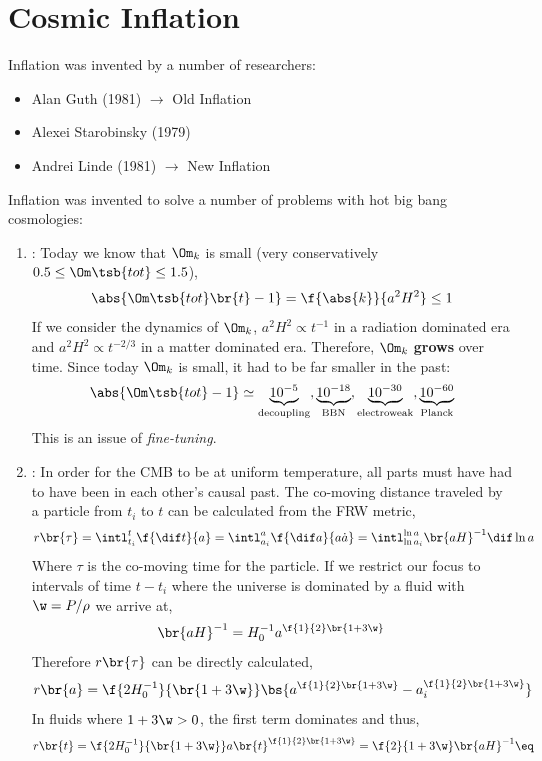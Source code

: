 \documentclass{article}
\begin{document}
\section{Cosmic Inflation}

Inflation was invented by a number of researchers:
\begin{itemize}
    \item Alan Guth (1981) $\to$ Old Inflation
    \item Alexei Starobinsky (1979)
    \item Andrei Linde (1981) $\to$ New Inflation
\end{itemize}

Inflation was invented to solve a number of problems with hot big bang cosmologies:
\begin{enumerate}
    \item {}: Today we know that $\Om_k$ is small (very conservatively $0.5 \leq \Om\tsb{tot} \leq 1.5$),
    \[ \abs{\Om\tsb{tot}\br{t} - 1} = \f{\abs{k}}{a^2 H^2} \leq 1 \]
    If we consider the dynamics of $\Om_k$, $a^2 H^2 \propto t^{-1}$ in a radiation dominated era and $a^2 H^2 \propto t^{-2/3}$ in a matter dominated era. Therefore, $\Om_k$ \textbf{grows} over time. Since today $\Om_k$ is small, it had to be far smaller in the past:
    \[ \abs{\Om\tsb{tot} - 1} \simeq \underbrace{10^{-5}}_{\text{decoupling}}, \underbrace{10^{-18}}_{\text{BBN}}, \underbrace{10^{-30}}_{\text{electroweak}}, \underbrace{10^{-60}}_{\text{Planck}} \]
    This is an issue of \textit{fine-tuning}.
    \item {}: In order for the CMB to be at uniform temperature, all parts must have had to have been in each other's causal past.
    The co-moving distance traveled by a particle from $t_i$ to $t$ can be calculated from the FRW metric,
    \[ r\br{\tau} = \intl_{t_i}^{t} \f{\dif t}{a} = \intl_{a_i}^{a}\f{\dif a}{a \dot a} = \intl_{\ln a_i}^{\ln a} \br{a H}^{-1}\dif \ln a \]
    Where $\tau$ is the co-moving time for the particle. If we restrict our focus to intervals of time $t - t_i$ where the universe is dominated by a fluid with $\w = P / \rho$ we arrive at,
    \[ \br{a H}^{-1} = H_{0}^{-1}a^{\f{1}{2}\br{1 + 3 \w}} \]
    Therefore $r\br{\tau}$ can be directly calculated,
    \[ r\br{a} = \f{2H_0^{-1}}{\br{1 + 3 \w}}\bs{a^{\f{1}{2}\br{1 + 3 \w}} - a_i^{\f{1}{2}\br{1 + 3 \w}}} \]
    In fluids where $1 + 3 \w > 0$, the first term dominates and thus,
    \[ r\br{t} = \f{2H_0^{-1}}{\br{1 + 3 \w}}a\br{t}^{\f{1}{2}\br{1 + 3 \w}} = \f{2}{1 + 3 \w}\br{a H}^{-1} \eq \label{eq:rt} \]

\end{enumerate}
\end{document}
